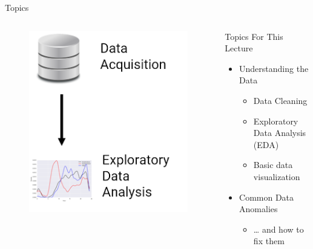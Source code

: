 \documentclass[aspectratio=169]{../latex_main/tntbeamer}  %
\begin{document}
	
	\begin{frame}{Topics}
	    \begin{columns}
	    
	    \begin{column}{.4\textwidth}
	    
	    
	    \begin{figure}
	        \includegraphics[scale=.35]{Bild3}
	    \end{figure}
	   \end{column}
	   
	   \begin{column}{.4\textwidth}
	        Topics For This Lecture 
            \begin{itemize}
                \item Understanding the Data
                \begin{itemize}
                    \item Data Cleaning 
                    \item Exploratory Data Analysis (EDA)
                    \item Basic data visualization
                \end{itemize}
                \item Common Data Anomalies 
                \begin{itemize}
                    \item … and how to fix them
                \end{itemize}
            \end{itemize}
	   \end{column}
	   
	   
	    \end{columns}
	\end{frame}
	
\end{document}
